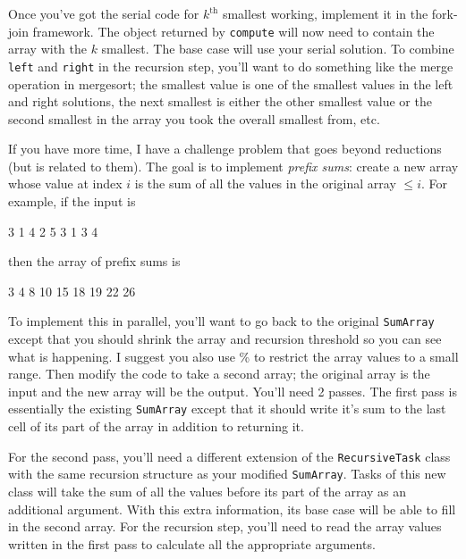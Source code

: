 \documentclass{article}
\begin{document}
Once you've got the serial code for $k^\text{th}$ smallest working,
implement it in the fork-join framework.
The object returned by {\tt compute} will now need to contain the
array with the $k$ smallest.
The base case will use your serial solution.
To combine {\tt left} and {\tt right} in the recursion step, you'll
want to do something like the merge operation in mergesort; the
smallest value is one of the smallest values in the left and right
solutions, the next smallest is either the other smallest value or the
second smallest in the array you took the overall smallest from, etc.

If you have more time, I have a challenge problem that goes beyond
reductions (but is related to them).
The goal is to implement {\em prefix sums}:
create a new array whose value at index $i$ is the sum of all the
values in the original array $\leq i$.
For example, if the input is
\begin{center}
3 1 4 2 5 3 1 3 4
\end{center}
then the array of prefix sums is
\begin{center}
3 4 8 10 15 18 19 22 26
\end{center}

To implement this in parallel, you'll want to go back to the original
{\tt SumArray} except that you should shrink the array and recursion
threshold so you can see what is happening.
I suggest you also use \% to restrict the array values to a small
range.
Then modify the code to take a second array; the original array is the
input and the new array will be the output.
You'll need 2 passes.
The first pass is essentially the existing {\tt SumArray} except that
it should write it's sum to the last cell of its part of the array in
addition to returning it.

For the second pass, you'll need a different extension of the
{\tt RecursiveTask} class with the same recursion structure as your
modified {\tt SumArray}. 
Tasks of this new class will take the sum of all the values before its
part of the array as an additional argument.
With this extra information, its base case will be able to fill in the second array.
For the recursion step, you'll need to read the array values written
in the first pass to calculate all the appropriate arguments.
\end{document}

